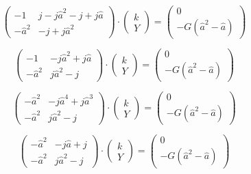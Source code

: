 \documentclass{article}
\begin{document}
$$
    \begin{pmatrix}
        -1         & j - j \hat{a}^2 - j + j \hat{a} \\
        -\hat{a}^2 & - j + j \hat{a}^2
    \end{pmatrix}
    \cdot
    \begin{pmatrix}
        k \\
        Y
    \end{pmatrix}
    =
    \begin{pmatrix}
        0 \\
        - G (\hat{a}^2 - \hat{a})
    \end{pmatrix}
$$

$$
    \begin{pmatrix}
        -1         & - j \hat{a}^2 + j \hat{a} \\
        -\hat{a}^2 & j \hat{a}^2 - j
    \end{pmatrix}
    \cdot
    \begin{pmatrix}
        k \\
        Y
    \end{pmatrix}
    =
    \begin{pmatrix}
        0 \\
        - G (\hat{a}^2 - \hat{a})
    \end{pmatrix}
$$

$$
    \begin{pmatrix}
        -\hat{a}^2 & - j \hat{a}^4 + j \hat{a}^3 \\
        -\hat{a}^2 & j \hat{a}^2 - j
    \end{pmatrix}
    \cdot
    \begin{pmatrix}
        k \\
        Y
    \end{pmatrix}
    =
    \begin{pmatrix}
        0 \\
        - G (\hat{a}^2 - \hat{a})
    \end{pmatrix}
$$

$$
    \begin{pmatrix}
        -\hat{a}^2 & - j \hat{a} + j \\
        -\hat{a}^2 & j \hat{a}^2 - j
    \end{pmatrix}
    \cdot
    \begin{pmatrix}
        k \\
        Y
    \end{pmatrix}
    =
    \begin{pmatrix}
        0 \\
        - G (\hat{a}^2 - \hat{a})
    \end{pmatrix}
$$
\end{document}
